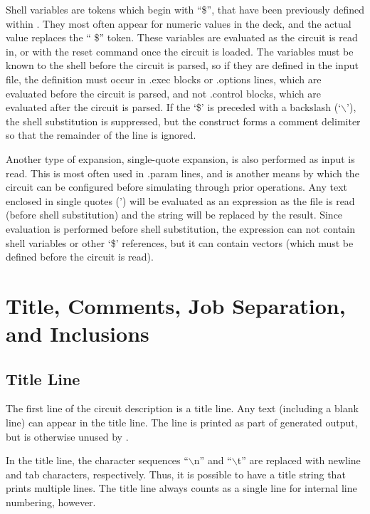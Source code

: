 Shell variables are tokens which begin with ``{\vt \$}'', that have
been previously defined within {\WRspice}.  They most often appear for
numeric values in the deck, and the actual value replaces the ``{\vt
\$}'' token.  These variables are evaluated as the circuit is read in,
or with the {\cb reset} command once the circuit is loaded.  The
variables must be known to the shell before the circuit is parsed, so
if they are defined in the input file, the definition must occur in
{\vt .exec} blocks or {\vt .options} lines, which are evaluated before
the circuit is parsed, and not {\vt .control} blocks, which are
evaluated after the circuit is parsed.  If the `{\vt \$}' is preceded
with a backslash (`$\backslash$'), the shell substitution is
suppressed, but the construct forms a comment delimiter so that the
remainder of the line is ignored.


Another type of expansion, single-quote expansion, is also performed
as input is read.  This is most often used in {\vt .param} lines, and
is another means by which the circuit can be configured before
simulating through prior {\WRspice} operations.  Any text enclosed in
single quotes (') will be evaluated as an expression as the file is
read (before shell substitution) and the string will be replaced by
the result.  Since evaluation is performed before shell substitution,
the expression can not contain shell variables or other `{\vt \$}'
references, but it can contain vectors (which must be defined before
the circuit is read).


\section{Title, Comments, Job Separation, and Inclusions}


\subsection{Title Line}
The first line of the circuit description is a title line.  Any text
(including a blank line) can appear in the title line.  The line is
printed as part of generated output, but is otherwise unused by
{\WRspice}.

In the title line, the character sequences ``{\vt $\backslash$n}'' and
``{\vt $\backslash$t}'' are replaced with newline and tab characters,
respectively.  Thus, it is possible to have a title string that prints
multiple lines.  The title line always counts as a single line for
internal line numbering, however.


